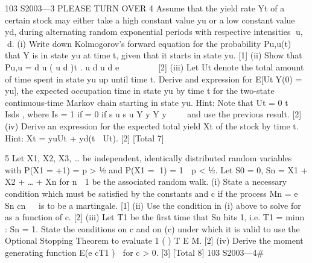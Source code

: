 \documentclass[a4paper,12pt]{article}
\begin{document}
\begin{enumerate}
103 S2003—3 PLEASE TURN OVER
4 Assume that the yield rate Yt of a certain stock may either take a high constant value
yu or a low constant value yd, during alternating random exponential periods with
respective intensities u, d.
(i) Write down Kolmogorov’s forward equation for the probability Pu,u(t) that Y
is in state yu at time t, given that it starts in state yu. [1]
(ii) Show that
Pu,u = d u ( u d )t .
u d u d
e    

   
[2]
(iii) Let Ut denote the total amount of time spent in state yu up until time t. Derive
and expression for E[UtY(0) = yu], the expected occupation time in state yu
by time t for the two-state continuous-time Markov chain starting in state yu.
Hint: Note that Ut =
0
t
 Isds , where Is =
1 if =
0 if
s u
s u
Y y
Y y

 
and use the previous
result. [2]
(iv) Derive an expression for the expected total yield Xt of the stock by time t.
Hint: Xt = yuUt + yd(t  Ut). [2]
[Total 7]

5 Let X1, X2, X3, … be independent, identically distributed random variables with
P(X1 = +1) = p > ½ and P(X1 = 1) = 1  p < ½. Let S0 = 0, Sn = X1 + X2 + … + Xn
for n  1 be the associated random walk.
(i) State a necessary condition which must be satisfied by the constants 	 and c if
the process
Mn = e Sn cn  
is to be a martingale. [1]
(ii) Use the condition in (i) above to solve for 	 as a function of c. [2]
(iii) Let T1 be the first time that Sn hits 1, i.e. T1 = min{n : Sn = 1}. State the
conditions on c and on 	(c) under which it is valid to use the Optional
Stopping Theorem to evaluate 1 ( ) T E M. [2]
(iv) Derive the moment generating function E(e cT1 )  for c > 0. [3]
[Total 8]
103 S2003—4#




\end{enumerate}
\end{document}
